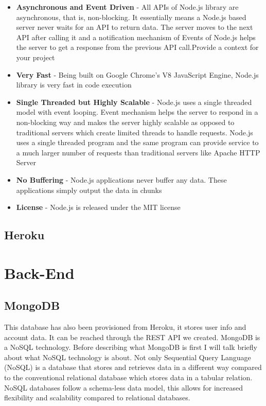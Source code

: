 \begin{itemize}

\item \textbf{Asynchronous and Event Driven}  - All APIs of Node.js library are asynchronous, that is, non-blocking. It essentially means a Node.js based server never waits for an API to return data. The server moves to the next API after calling it and a notification mechanism of Events of Node.js helps the server to get a response from the previous API call.Provide a context for your project \cite{node2}

\item \textbf{Very Fast} - Being built on Google Chrome's V8 JavaScript Engine, Node.js library is very fast in code execution \cite{node2}

\item \textbf{Single Threaded but Highly Scalable} - Node.js uses a single threaded model with event looping. Event mechanism helps the server to respond in a non-blocking way and makes the server highly scalable as opposed to traditional servers which create limited threads to handle requests. Node.js uses a single threaded program and the same program can provide service to a much larger number of requests than traditional servers like Apache HTTP Server\cite{node2}

\item \textbf{No Buffering} - Node.js applications never buffer any data. These applications simply output the data in chunks \cite{node2}

\item \textbf{License} - Node.js is released under the MIT license \cite{node2}

\end{itemize}


\subsection{Heroku}

\section{Back-End}
\subsection{MongoDB}
This database has also been provisioned from Heroku, it stores user info and account data. It can be reached through the REST API we created. MongoDB is a NoSQL technology. Before describing what MongoDB is first I will talk briefly about what NoSQL technology is about. Not only Sequential Query Language (NoSQL) is a database that stores and retrieves data in a different way compared to the conventional relational database which stores data in a tabular relation. NoSQL databases follow a schema-less data model, this allows for increased flexibility and scalability compared to relational databases.


